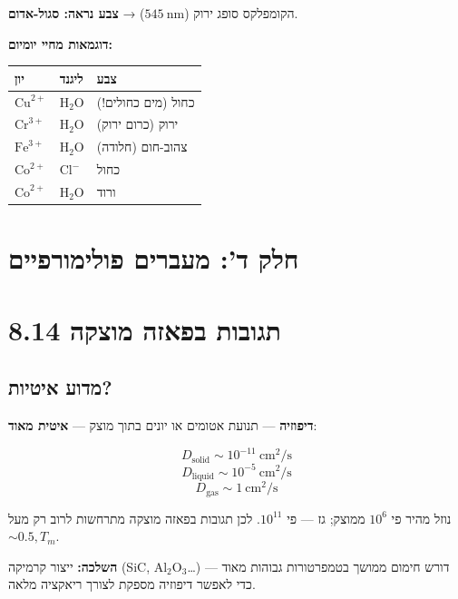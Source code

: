 \documentclass[
  hebrew,
  letterpaper,
  DIV=11,
  numbers=noendperiod]{scrreprt}
\newcounter{none} %
\begin{document}
הקומפלקס סופג ירוק (\(545\ \text{nm}\)) → \textbf{צבע נראה: סגול-אדום}.

\textbf{דוגמאות מחיי יומיום:}

{\def\LTcaptype{none} %
\begin{longtable}[]{@{}lll@{}}
\toprule\noalign{}
יון & ליגנד & צבע \\
\midrule\noalign{}
\endhead
\bottomrule\noalign{}
\endlastfoot
\(\text{Cu}^{2+}\) & \(\text{H}_2\text{O}\) & כחול (מים כחולים!) \\
\(\text{Cr}^{3+}\) & \(\text{H}_2\text{O}\) & ירוק (כרום ירוק) \\
\(\text{Fe}^{3+}\) & \(\text{H}_2\text{O}\) & צהוב-חום (חלודה) \\
\(\text{Co}^{2+}\) & \(\text{Cl}^-\) & כחול \\
\(\text{Co}^{2+}\) & \(\text{H}_2\text{O}\) & ורוד \\
\end{longtable}
}

\section{חלק ד': מעברים
פולימורפיים}\label{ux5d7ux5dcux5e7-ux5d3-ux5deux5e2ux5d1ux5e8ux5d9ux5dd-ux5e4ux5d5ux5dcux5d9ux5deux5d5ux5e8ux5e4ux5d9ux5d9ux5dd}

\section{8.14 תגובות בפאזה
מוצקה}\label{ux5eaux5d2ux5d5ux5d1ux5d5ux5ea-ux5d1ux5e4ux5d0ux5d6ux5d4-ux5deux5d5ux5e6ux5e7ux5d4}

\subsection{מדוע
איטיות?}\label{ux5deux5d3ux5d5ux5e2-ux5d0ux5d9ux5d8ux5d9ux5d5ux5ea}

\textbf{דיפוזיה} --- תנועת אטומים או יונים בתוך מוצק --- \textbf{איטית
מאוד}:

\[D_\text{solid} \sim 10^{-11}\ \text{cm}^2/\text{s}\]
\[D_\text{liquid} \sim 10^{-5}\ \text{cm}^2/\text{s}\]
\[D_\text{gas} \sim 1\ \text{cm}^2/\text{s}\]

נוזל מהיר פי \(10^6\) ממוצק; גז --- פי \(10^{11}\). לכן תגובות בפאזה
מוצקה מתרחשות לרוב רק מעל \(\sim 0.5,T_m\).

\textbf{השלכה:} ייצור קרמיקה (SiC, \(\text{Al}_2\text{O}_3\)\ldots) דורש
חימום ממושך בטמפרטורות גבוהות מאוד --- כדי לאפשר דיפוזיה מספקת לצורך
ריאקציה מלאה.
\end{document}
